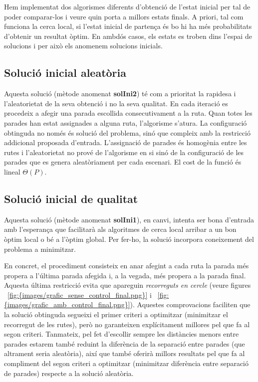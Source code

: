 
Hem implementat dos algorismes diferents d'obtenció de l'estat inicial per tal de poder comparar-los i veure quin porta a millors estats finals. A priori, tal com funciona la cerca local, si l'estat inicial de partença és bo hi ha més probabilitats d'obtenir un resultat òptim.  En ambdós casos, els estats es troben dins l'espai de solucions i per això els anomenem solucions inicials.

\subsection{Solució inicial aleatòria}

Aquesta solució (mètode anomenat \textbf{solIni2}) té com a prioritat la rapidesa i l'aleatorietat de la seva obtenció i no la seva qualitat. En cada iteració es procedeix a afegir una parada escollida consecutivament a la ruta. Quan totes les parades han estat assignades a alguna ruta, l'algorisme s'atura. La configuració obtinguda no només és solució del problema, sinó que compleix amb la restricció addicional proposada d'entrada. L'assignació de parades és homogènia entre les rutes i l'aleatorietat no prové de l'algorisme en si sinó de la configuració de les parades que es genera aleatòriament per cada escenari. El cost de la funció és lineal $\Theta(P)$.

\subsection{Solució inicial de qualitat}

Aquesta solució (mètode anomenat \textbf{solIni1}), en canvi, intenta ser bona d'entrada amb l'esperança que facilitarà als algoritmes de cerca local arribar a un bon òptim local o bé a l'òptim global. Per fer-ho, la solució incorpora coneixement del problema a minimitzar. 

En concret, el procediment consisteix en anar afegint a cada ruta la parada més propera a l'última parada afegida i, a la vegada, més propera a la parada final. Aquesta última restricció evita que apareguin \emph{recorreguts en cercle} (veure figures ~\ref{fig:{images/grafic_sense_control_final.png}} i ~\ref{fig:{images/grafic_amb_control_final.png}}). Aquestes comprovacions faciliten que la solució obtinguda segueixi el primer criteri a optimitzar (minimitzar el recorregut de les rutes), però no garanteixen explícitament millores pel que fa al segon criteri. Tanmateix, pel fet d'escollir sempre les distàncies menors entre parades estarem també reduint la diferència de la separació entre parades (que altrament seria aleatòria), així que també oferirà millors resultats pel que fa al compliment del segon criteri a optimitzar (minimitzar diferència entre separació de parades) respecte a la solució aleatòria.


